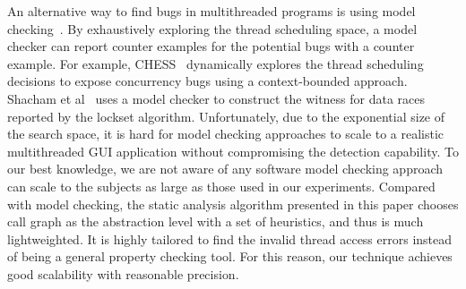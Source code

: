 An alternative way to find bugs in multithreaded programs is using model checking~\cite{Nori:2010:ESO, Inverardi:2000, Siegel:2008}.
By exhaustively exploring the thread scheduling space, a model checker can
report counter examples for the potential bugs with a counter example. For example,
CHESS~\cite{chess} dynamically explores the thread scheduling decisions to expose
concurrency bugs using a context-bounded approach. Shacham et al~\cite{Shacham:2007} uses
a model checker to construct the witness for data races reported by the lockset algorithm.
Unfortunately, due to the exponential size of the search space,
 it is hard for model checking approaches to scale to a realistic multithreaded GUI application
 without compromising the detection capability. To our best knowledge,
we are not aware of any software model checking approach can scale to the subjects
as large as those used in our experiments. Compared with model checking, the static analysis
algorithm presented in this paper chooses call graph as the
abstraction level with a set of heuristics, and thus is much lightweighted. It is highly tailored to find the invalid thread
access errors instead of being a general property checking tool. For this reason,
our technique achieves good scalability with reasonable precision.



